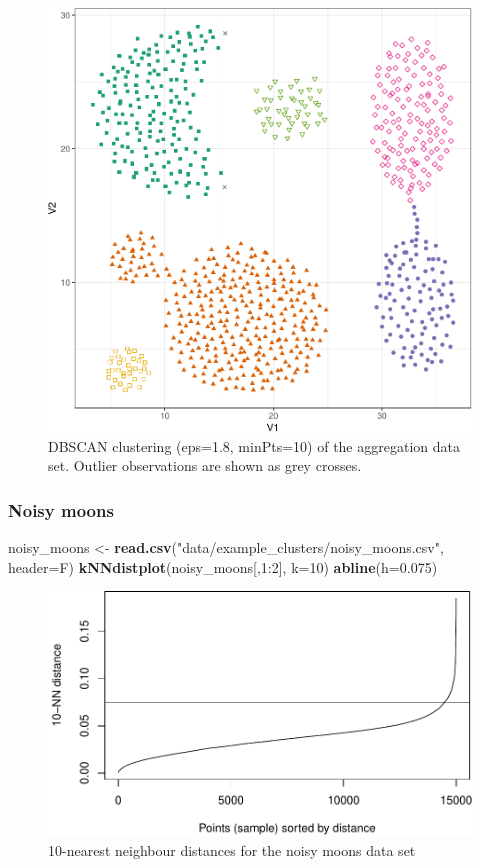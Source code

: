 \documentclass[]{book}
\newenvironment{Shaded}{\begin{snugshade}}{\end{snugshade}}
\newcommand{\KeywordTok}[1]{\textcolor[rgb]{0.13,0.29,0.53}{\textbf{{#1}}}}
\newcommand{\DataTypeTok}[1]{\textcolor[rgb]{0.13,0.29,0.53}{{#1}}}
\newcommand{\DecValTok}[1]{\textcolor[rgb]{0.00,0.00,0.81}{{#1}}}
\newcommand{\FloatTok}[1]{\textcolor[rgb]{0.00,0.00,0.81}{{#1}}}
\newcommand{\StringTok}[1]{\textcolor[rgb]{0.31,0.60,0.02}{{#1}}}
\newcommand{\NormalTok}[1]{{#1}}
\theoremstyle{definition}
\theoremstyle{definition}
\theoremstyle{definition}
\theoremstyle{remark}
\begin{document}
\begin{figure}

{\centering \includegraphics[width=0.6\linewidth]{09-clustering_files/figure-latex/aggregationDBSCANscatter-1} 

}

\caption{DBSCAN clustering (eps=1.8, minPts=10) of the aggregation data set. Outlier observations are shown as grey crosses.}\label{fig:aggregationDBSCANscatter}
\end{figure}

\subsubsection{Noisy moons}\label{noisy-moons-1}

\begin{Shaded}
\begin{Highlighting}[]
\NormalTok{noisy_moons <-}\StringTok{ }\KeywordTok{read.csv}\NormalTok{(}\StringTok{"data/example_clusters/noisy_moons.csv"}\NormalTok{, }\DataTypeTok{header=}\NormalTok{F)}
\KeywordTok{kNNdistplot}\NormalTok{(noisy_moons[,}\DecValTok{1}\NormalTok{:}\DecValTok{2}\NormalTok{], }\DataTypeTok{k=}\DecValTok{10}\NormalTok{)}
\KeywordTok{abline}\NormalTok{(}\DataTypeTok{h=}\FloatTok{0.075}\NormalTok{)}
\end{Highlighting}
\end{Shaded}

\begin{figure}

{\centering \includegraphics[width=0.75\linewidth]{09-clustering_files/figure-latex/noisyMoonsKNNdist-1} 

}

\caption{10-nearest neighbour distances for the noisy moons data set}\label{fig:noisyMoonsKNNdist}
\end{figure}
\end{document}
